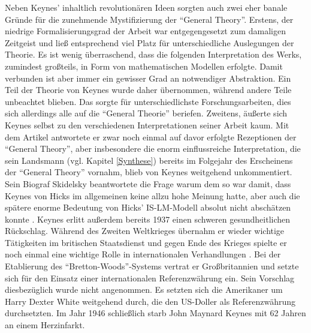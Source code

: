Neben Keynes' inhaltlich revolutionären Ideen sorgten auch zwei eher banale Gründe für die zunehmende Mystifizierung der "`General Theory"'. Erstens, der niedrige Formalisierungsgrad der Arbeit war entgegengesetzt zum damaligen Zeitgeist und ließ entsprechend viel Platz für unterschiedliche Auslegungen der Theorie. Es ist wenig überraschend, dass die folgenden Interpretation des Werks, zumindest großteils, in Form von mathematischen Modellen erfolgte. Damit verbunden ist aber immer ein gewisser Grad an notwendiger Abstraktion. Ein Teil der Theorie von Keynes wurde daher übernommen, während andere Teile unbeachtet blieben. Das sorgte für unterschiedlichste Forschungsarbeiten, dies sich allerdings alle auf die "`General Theorie"' beriefen. Zweitens, äußerte sich Keynes selbst zu den verschiedenen Interpretationen seiner Arbeit kaum. Mit dem Artikel \textcite{Keynes1937} antwortete er zwar noch einmal auf davor erfolgte Rezeptionen der "`General Theory"', aber insbesondere die enorm einflussreiche Interpretation, die sein Landsmann \textcite{Hicks1937} (vgl. Kapitel \ref{Synthese}) bereits im Folgejahr des Erscheinens der "`General Theory"' vornahm, blieb von Keynes weitgehend unkommentiert. Sein Biograf Skidelsky \parencite{Snowdon2005} beantwortete die Frage warum dem so war damit, dass Keynes von Hicks im allgemeinen keine allzu hohe Meinung hatte, aber auch die spätere enorme Bedeutung von Hicks' IS-LM-Modell absolut nicht abschätzen konnte \parencite[S. 96]{Snowdon2005}. Keynes erlitt außerdem bereits 1937 einen schweren gesundheitlichen Rückschlag. Während des Zweiten Weltkrieges übernahm er wieder wichtige Tätigkeiten im britischen Staatsdienst und gegen Ende des Krieges spielte er noch einmal eine wichtige Rolle in internationalen Verhandlungen \parencite[S. 277]{Scherf1989}. Bei der Etablierung des "`Bretton-Woods"'-Systems vertrat er Großbritannien und setzte sich für den Einsatz einer internationalen Referenzwährung ein. Sein Vorschlag diesbezüglich wurde nicht angenommen. Es setzten sich die Amerikaner um Harry Dexter White weitgehend durch, die den US-Doller als Referenzwährung durchsetzten. Im Jahr 1946 schließlich starb John Maynard Keynes mit 62 Jahren an einem Herzinfarkt.

